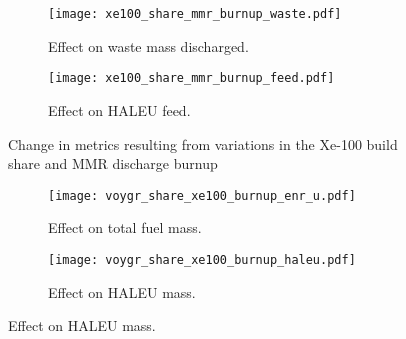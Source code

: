 \begin{figure}
    \ContinuedFloat    
    \begin{subfigure}[t]{0.48\textwidth}
        \centering
        \texttt{[image: xe100\_share\_mmr\_burnup\_waste.pdf]}
        \caption{Effect on waste mass discharged.}
        \label{fig:xe100_share_mmr_burnup_waste}
    \end{subfigure}
    \hfill
    \begin{subfigure}[t]{0.48\textwidth}
        \centering
        \texttt{[image: xe100\_share\_mmr\_burnup\_feed.pdf]}
        \caption{Effect on HALEU feed.}
        \label{fig:xe100_share_mmr_burnup_feed}
    \end{subfigure}
    \caption{Change in metrics resulting from variations in the 
    Xe-100 build share and MMR discharge burnup}
    \label{fig:xe100_share_mmr_burnup}
\end{figure}
\begin{figure}
    \begin{subfigure}[t]{0.48\textwidth}
        \centering
        \texttt{[image: voygr\_share\_xe100\_burnup\_enr\_u.pdf]}
        \caption{Effect on total fuel mass.}
        \label{fig:voygr_share_xe100_burnup_enr_u}
    \end{subfigure}
    \hfill
    \begin{subfigure}[t]{0.48\textwidth}
        \centering
        \texttt{[image: voygr\_share\_xe100\_burnup\_haleu.pdf]}
        \caption{Effect on HALEU mass.}
        \label{fig:voygr_share_xe100_burnup_haleu}
    \end{subfigure}
\end{figure}


